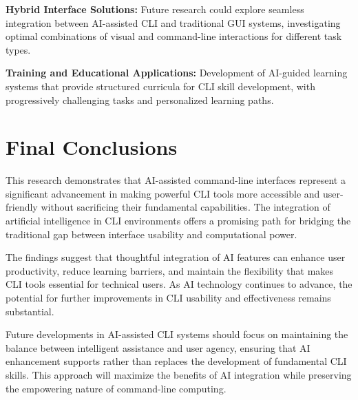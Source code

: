 \textbf{Hybrid Interface Solutions:}
Future research could explore seamless integration between AI-assisted CLI and traditional GUI systems, investigating optimal combinations of visual and command-line interactions for different task types.

\textbf{Training and Educational Applications:}
Development of AI-guided learning systems that provide structured curricula for CLI skill development, with progressively challenging tasks and personalized learning paths.

\section{Final Conclusions}

This research demonstrates that AI-assisted command-line interfaces represent a significant advancement in making powerful CLI tools more accessible and user-friendly without sacrificing their fundamental capabilities. The integration of artificial intelligence in CLI environments offers a promising path for bridging the traditional gap between interface usability and computational power.

The findings suggest that thoughtful integration of AI features can enhance user productivity, reduce learning barriers, and maintain the flexibility that makes CLI tools essential for technical users. As AI technology continues to advance, the potential for further improvements in CLI usability and effectiveness remains substantial.

Future developments in AI-assisted CLI systems should focus on maintaining the balance between intelligent assistance and user agency, ensuring that AI enhancement supports rather than replaces the development of fundamental CLI skills. This approach will maximize the benefits of AI integration while preserving the empowering nature of command-line computing.
